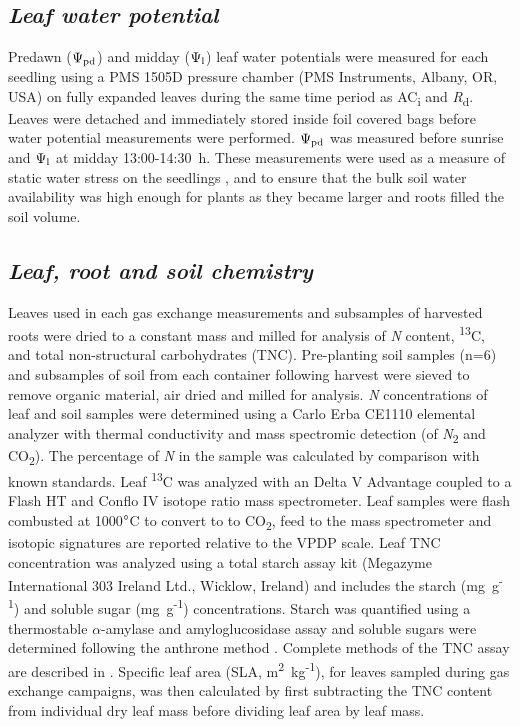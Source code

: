 \documentclass[a4paper]{article}\usepackage[]{graphicx}\usepackage[]{color}
\begin{document}
\subsection*{\textit{Leaf water potential}}
Predawn ($\Psi\textsubscript{pd}$) and midday ($\Psi\textsubscript{l}$) leaf water potentials were measured for each seedling using a PMS 1505D pressure chamber (PMS Instruments, Albany, OR, USA) on fully expanded leaves during the same time period as AC\textsubscript{i} and \textit{R}\textsubscript{d}. Leaves were detached and immediately stored inside foil covered bags before water potential measurements were performed. $\Psi\textsubscript{pd}$ was measured before sunrise and $\Psi\textsubscript{l}$ at midday 13:00-14:30~h. These measurements were used as a measure of static water stress on the seedlings \citep{sellin1999does}, and to ensure that the bulk soil water availability was high enough for plants as they became larger and roots filled the soil volume. 

\subsection*{\textit{Leaf, root and soil chemistry}}
Leaves used in each gas exchange measurements and subsamples of harvested roots were dried to a constant mass and milled for analysis of \textit{N} content, {\textdelta}\textsuperscript{13}C, and total non-structural carbohydrates (TNC). Pre-planting soil samples (n=6) and subsamples of soil from each container following harvest were sieved to remove organic material, air dried and milled for analysis. \textit{N} concentrations of leaf and soil samples were determined using a Carlo Erba CE1110 elemental analyzer with thermal conductivity and mass spectromic detection (of \textit{N}\textsubscript{2} and CO\textsubscript{2}).  The percentage of \textit{N} in the sample was calculated by comparison with known standards. Leaf {\textdelta}\textsuperscript{13}C was analyzed  with an Delta V Advantage coupled to a Flash HT and Conflo IV isotope ratio mass spectrometer. Leaf samples were flash combusted at 1000$\degree$C to convert to to CO\textsubscript{2}, feed to the mass spectrometer and isotopic signatures are reported relative to the VPDP scale. Leaf TNC concentration was analyzed using a total starch assay kit (Megazyme International 303 Ireland Ltd., Wicklow, Ireland) and includes the starch (mg~g\textsuperscript{-1}) and soluble sugar (mg~g\textsuperscript{-1}) concentrations. Starch was quantified using a thermostable $\alpha$-amylase and amyloglucosidase assay \citep{McCleary_starch} and soluble sugars were determined following the anthrone method \citep{ebell1969variation}. Complete methods of the TNC assay are described in \citep{mitchell2013drought}. Specific leaf area (SLA, m\textsuperscript{2}~kg\textsuperscript{-1}), for leaves sampled during gas exchange campaigns, was then calculated by first subtracting the TNC content from individual dry leaf mass before dividing leaf area by leaf mass.
\end{document}
